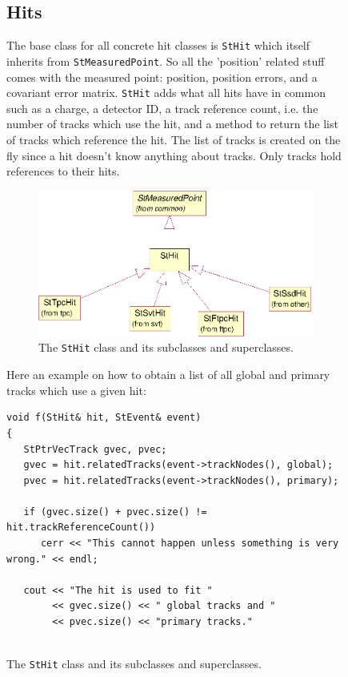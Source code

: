 \documentclass[twoside]{article}
\begin{document}
\begin{figure}[htb]
\begin{center}
\subsection{Hits}
  The base class for all concrete
hit classes is \texttt{StHit} which itself inherits from
\texttt{StMeasuredPoint}. So all the 'position' related stuff comes
with the measured point: position, position errors, and a covariant
error matrix.  \texttt{StHit} adds what all hits have in common such
as a charge, a detector ID, a track reference count, i.e. the number
of tracks which use the hit, and a method to return the list of
tracks which reference the hit.  The list of tracks is created on the
fly since a hit doesn't know anything about tracks. Only tracks hold
references to their hits.
\begin{figure}[htb]
    \begin{center}
        \includegraphics{hits.eps}
        \caption{The \texttt{StHit} class and its subclasses and superclasses.}
        \label{fig:hits}
    \end{center}
\end{figure}

Here an example on how to obtain a list of all global and primary
tracks which use a given hit:
\begin{verbatim}
void f(StHit& hit, StEvent& event)
{
   StPtrVecTrack gvec, pvec;
   gvec = hit.relatedTracks(event->trackNodes(), global);
   pvec = hit.relatedTracks(event->trackNodes(), primary);

   if (gvec.size() + pvec.size() != hit.trackReferenceCount())
      cerr << "This cannot happen unless something is very wrong." << endl;

   cout << "The hit is used to fit "
        << gvec.size() << " global tracks and "
        << pvec.size() << "primary tracks."


\end{verbatim}
\end{center}
\end{figure}
\end{document}
